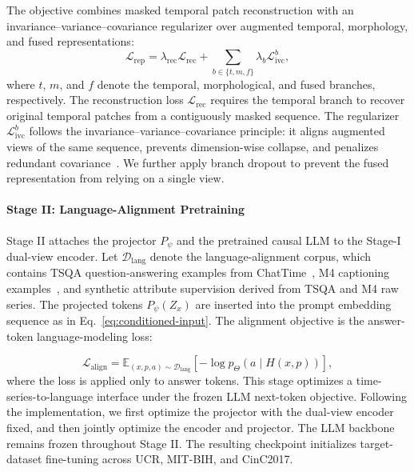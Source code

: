 \documentclass[10pt,journal,compsoc]{IEEEtran}
\begin{document}
The objective combines masked temporal patch reconstruction with an invariance--variance--covariance regularizer over augmented temporal, morphology, and fused representations:
\begin{equation}
\label{eq:representation-pretraining-loss}
\mathcal{L}_{\mathrm{rep}}
=
\lambda_{\mathrm{rec}}\mathcal{L}_{\mathrm{rec}}
+
\sum_{b\in\{t,m,f\}}
\lambda_b\mathcal{L}_{\mathrm{ivc}}^b ,
\end{equation}
where $t$, $m$, and $f$ denote the temporal, morphological, and fused branches, respectively.
The reconstruction loss $\mathcal{L}_{\mathrm{rec}}$ requires the temporal branch to recover original temporal patches from a contiguously masked sequence.
The regularizer $\mathcal{L}_{\mathrm{ivc}}^b$ follows the invariance--variance--covariance principle: it aligns augmented views of the same sequence, prevents dimension-wise collapse, and penalizes redundant covariance~\cite{bardes2022vicreg}.
We further apply branch dropout to prevent the fused representation from relying on a single view.

\paragraph{Stage II: Language-Alignment Pretraining}
Stage II attaches the projector $P_\psi$ and the pretrained causal LLM to the Stage-I dual-view encoder.
Let $\mathcal{D}_{\mathrm{lang}}$ denote the language-alignment corpus, which contains TSQA question-answering examples from ChatTime~\cite{wang2025chattime}, M4 captioning examples~\cite{makridakis2020m4}, and synthetic attribute supervision derived from TSQA and M4 raw series.
The projected tokens $P_\psi(Z_x)$ are inserted into the prompt embedding sequence as in Eq.~\eqref{eq:conditioned-input}.
The alignment objective is the answer-token language-modeling loss:

\begin{equation}
\label{eq:language-alignment-loss}
\mathcal{L}_{\mathrm{align}}
=
\mathbb{E}_{(x,p,a)\sim\mathcal{D}_{\mathrm{lang}}}
\left[
-\log p_{\Theta}(a\mid H(x,p))
\right],
\end{equation}
where the loss is applied only to answer tokens.
This stage optimizes a time-series-to-language interface under the frozen LLM next-token objective.
Following the implementation, we first optimize the projector with the dual-view encoder fixed, and then jointly optimize the encoder and projector.
The LLM backbone remains frozen throughout Stage II.
The resulting checkpoint initializes target-dataset fine-tuning across UCR, MIT-BIH, and CinC2017.
\end{document}
